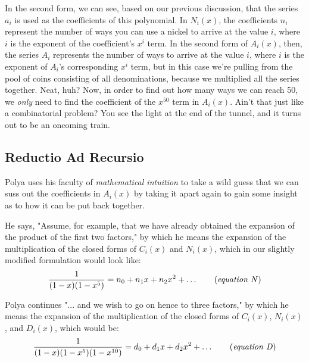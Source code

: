 In the second form, we can see, based on our previous discussion, that the series $a_i$ is used as the coefficients of this polynomial.  In $N_i(x)$, the coefficients $n_i$ represent the number of ways you can use a nickel to arrive at the value $i$, where $i$ is the exponent of the coefficient's $x^i$ term.  In the second form of $A_i(x)$, then, the series $A_i$ represents the number of ways to arrive at the value $i$, where $i$ is the exponent of $A_i$'s corresponding $x^i$ term, but in this case we're pulling from the pool of coins consisting of all denominations, because we multiplied all the series together.  Neat, huh?  Now, in order to find out how many ways we can reach 50\textcent, we \textit{only} need to find the coefficient of the $x^{50}$ term in $A_i(x)$.  Ain't that just like a combinatorial problem?  You see the light at the end of the tunnel, and it turns out to be an oncoming train.

\subsection{Reductio Ad Recursio}
Polya uses his faculty of \textit{mathematical intuition} to take a wild guess that we can suss out the coefficients in $A_i(x)$ by taking it apart again to gain some insight as to how it can be put back together.  

He says, "Assume, for example, that we have already obtained the expansion of the product of the first two factors," by which he means the expansion of the multiplication of the closed forms of $C_i(x)$ and $N_i(x)$, which in our slightly modified formulation would look like:
\begin{equation}
\displaystyle \frac{1}{(1-x)(1-x^5)} = n_0 + n_1x + n_2x^2 + \ldots
\tag{\textit{equation N}}
\end{equation}

Polya continues "... and we wish to go on hence to three factors," by which he means the expansion of the multiplication of the closed forms of $C_i(x)$, $N_i(x)$, and $D_i(x)$, which would be:
\begin{equation}
\displaystyle \frac{1}{(1-x)(1-x^5)(1-x^{10})} = d_0 + d_1x + d_2x^2 + \ldots
\tag{\textit{equation D}}
\end{equation}

